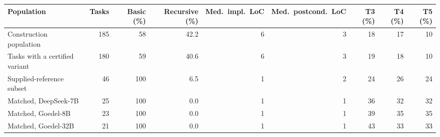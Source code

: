 \begin{tabular}{lrrrrrrrr}
\toprule
Population & Tasks & Basic (\%) & Recursive (\%) & Med.\ impl.\ LoC & Med.\ postcond.\ LoC & T3 (\%) & T4 (\%) & T5 (\%) \\
\midrule
Construction population & 185 & 58 & 42.2 & 6 & 3 & 18 & 17 & 10 \\
Tasks with a certified variant & 180 & 59 & 40.6 & 6 & 3 & 19 & 18 & 10 \\
Supplied-reference subset & 46 & 100 & 6.5 & 1 & 2 & 24 & 26 & 24 \\
Matched, DeepSeek-7B & 25 & 100 & 0.0 & 1 & 1 & 36 & 32 & 32 \\
Matched, Goedel-8B & 23 & 100 & 0.0 & 1 & 1 & 39 & 35 & 35 \\
Matched, Goedel-32B & 21 & 100 & 0.0 & 1 & 1 & 43 & 33 & 33 \\
\bottomrule
\end{tabular}
